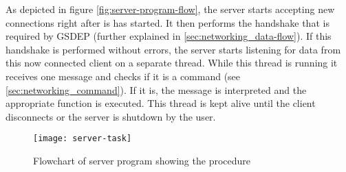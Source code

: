 As depicted in figure \vref{fig:server-program-flow}, the server starts accepting new connections right after is has started. It then performs the handshake that is required by GSDEP (further explained in \vref{sec:networking_data-flow}). If this handshake is performed without errors, the server starts listening for data from this now connected client on a separate thread. While this thread is running it receives one message and checks if it is a command (see \vref{sec:networking_command}). If it is, the message is interpreted and the appropriate function is executed. This thread is kept alive until the client disconnects or the server is shutdown by the user.

\begin{figure}[H]
	\centering
	\texttt{[image: server-task]}
	\caption{Flowchart of server program showing the procedure}
	\label{fig:server-program-flow}
\end{figure}
